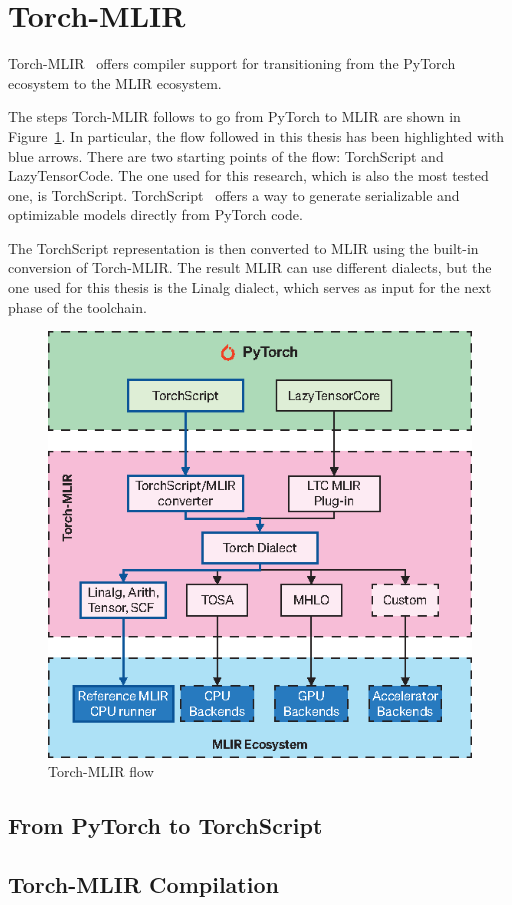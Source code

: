 \section{Torch-MLIR}
\label{sec:toolchain-torch_mlir}%

Torch-MLIR~\cite{torch_mlir} offers compiler support for transitioning from the PyTorch ecosystem to the MLIR ecosystem.

The steps Torch-MLIR follows to go from PyTorch to MLIR are shown in Figure~\ref{fig:torch-mlir}.
In particular, the flow followed in this thesis has been highlighted with blue arrows.
There are two starting points of the flow: TorchScript and LazyTensorCode.
The one used for this research, which is also the most tested one, is TorchScript.
TorchScript~\cite{torchscript} offers a way to generate serializable and optimizable models directly from PyTorch code.

The TorchScript representation is then converted to MLIR using the built-in conversion of Torch-MLIR. The result MLIR can use different dialects, but the one used for this thesis is the Linalg dialect, which serves as input for the next phase of the toolchain.

\begin{figure}[t]
    \centering
    \includegraphics[height=0.5\textwidth]{Images/torch-mlir}
    \caption{Torch-MLIR flow}
    \label{fig:torch-mlir}
\end{figure}

\subsection{From PyTorch to TorchScript}
\label{subsec:pytorch-to-torchscript}%

\subsection{Torch-MLIR Compilation}
\label{subsec:torch-mlir-compilation}%


